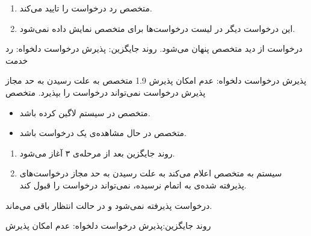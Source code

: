 {{\begin{enumerate}
		\item
		متخصص رد درخواست را تایید می‌کند.
		\item
		این درخواست دیگر در لیست درخواست‌ها برای متخصص نمایش داده نمی‌شود.
	\end{enumerate}
}
{
	درخواست از دید متخصص پنهان می‌شود.
}
{
روند جایگزین: پذیرش درخواست دلخواه: رد خدمت
}

\alternativeflow
{
پذیرش درخواست دلخواه:  عدم امکان پذیرش
}
{1.9}
{
	متخصص به علت رسیدن به حد مجاز پذیرش درخواست نمی‌تواند درخواست را بپذیرد.
}
{
	متخصص
}
{}
{
	\begin{itemize}
		\vspace*{-0.6cm}
		\item 
		متخصص در سیستم لاگین کرده باشد.
		\item
		متخصص در حال مشاهده‌ی یک درخواست باشد.
	\end{itemize}
}
{
	\vspace*{-0.6cm}
	\begin{enumerate}
		\item 
		روند جایگزین بعد از مرحله‌ی ۳ آغاز می‌شود.
		\item
		سیستم به متخصص اعلام می‌کند به علت رسیدن به حد مجاز درخواست‌های پذیرفته شده‌ی به اتمام نرسیده، نمی‌تواند درخواست را قبول کند.
		
	\end{enumerate}
}
{
	درخواست پذیرفته نمی‌شود و در حالت انتظار باقی می‌ماند.
	
}
{
	روند جایگزین:پذیرش درخواست دلخواه: عدم امکان پذیرش
}

}

